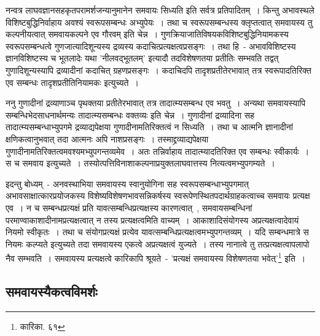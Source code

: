 		नन्वत्र लाघवज्ञानसहकृतपरामर्शजन्यानुमानेन समवायः सिध्यति इति सर्वत्र प्रतिपादितम्~। किन्तु अभावस्थले विशिष्टबुद्धिनिर्वाहाय अवश्यं स्वरूपसम्बन्धः अभ्युपेयः~। तथा च स्वरूपसम्बन्धस्य क्लृप्तत्वात् समवायस्य तु कल्पनीयत्वात् समवायकल्पने एव गौरवम् इति चेन्न~। गुणक्रियाजातिविषयकविशिष्टबुद्धिनियामकस्य स्वरूपसम्बन्धत्वे गुणजात्यादिशून्यस्य द्रव्यस्य कदाचित्प्रत्यक्षत्वप्रसङ्गः~। तथा हि~- अभावविशिष्टस्य ज्ञानविशिष्टस्य च भूतलादेः यथा 'नीलवद्भूतलम्' इत्यादौ तदविशेषणतया प्रतीतिः सम्भवति तद्वत् गुणादिशून्यस्यापि द्रव्यादीनां कदाचित् ग्रहणप्रसङ्गः~। कदाचिदपि तादृशप्रतीतेरभावात् तत्र स्वरूपादतिरिक्त एव सम्बन्धः तादृशप्रतीतिनियामकः इत्युच्यते~।

		ननु गुणादीनां द्रव्याणाञ्च पृथक्तया प्रतीतेरभावात् तत्र तादात्म्यसम्बन्ध एव भवतु~। अन्यथा समवायस्यापि सम्बन्धिभेदसाधनार्थमन्यः तादात्म्यसम्बन्धः वक्तव्यः इति चेन्न~। गुणादीनां द्रव्यादिना सह तादात्म्यसम्बन्धाभ्युपगमे द्रव्याद्यपेक्षया गुणादीनामतिरिक्तत्वं न सिध्यति~। तथा च आत्मनि ज्ञानादीनां क्षणिकत्वानुभवात् तदा आत्मनः अपि नाशप्रसङ्गः~। तस्माद्द्रव्याद्यपेक्षया गुणादीनामतिरिक्तत्वमवश्यमभ्युपगन्तव्यमेव~। अतः तन्निर्वाहाय तादात्म्यादतिरिक्त एव सम्बन्धः स्वीकार्यः~। स च समवाय इत्युच्यते~। तस्योत्पत्तिविनाशाकल्पनाप्रयुक्तलाघवात्तस्य नित्यत्वमभ्युपगम्यते~।

		इदन्तु बोध्यम्~- अनवस्थाभिया समवायस्य स्वानुयोगिना सह स्वरूपसम्बन्धाभ्युपगमात् अभावसाक्षात्कारप्रयोजकस्य विशेष्यविशेषणभावसन्निकर्षस्य स्वरूपेणस्थितपदार्थग्राहकत्वाच्च समवायः प्रत्यक्ष एव~। न च सम्बन्धप्रत्यक्षं प्रति यावत्सम्बन्धिप्रत्यक्षस्य कारणत्वात्~, समवायसम्बन्धिनां परमाण्वाकाशादीनामप्रत्यक्षत्वात् न तस्य प्रत्यक्षत्वमिति वाच्यम्~। आकाशादिसंयोगस्य अप्रत्यक्षत्वादेवायं नियमो स्वीकृतः~। तथा च संयोगप्रत्यक्षं प्रत्येव यावत्सम्बन्धिप्रत्यक्षत्वमभ्युपगन्तव्यम्~। यदि सम्बन्धमात्रे स नियमः कल्प्यते इत्युच्यते तदा समवायस्य एकत्वे अप्रत्यक्षत्वं युज्यते~। तस्य नानात्वे तु तत्प्रत्यक्षत्वापलापो नैव सम्भवति~। समवायस्य प्रत्यक्षत्वे कारिकापि श्रूयते~- 'प्रत्यक्षं समवायस्य विशेषणतया भवेत्'\footnote{कारिका. ६१} इति~।

		\subsection{समवायस्यैकत्वविमर्शः}

